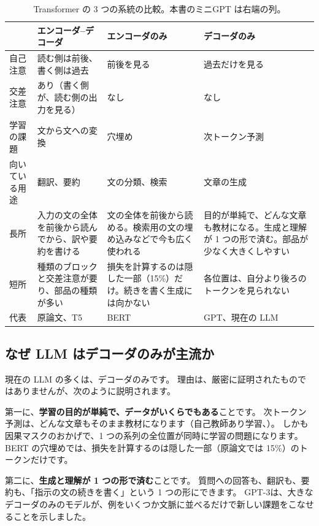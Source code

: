 \begin{table}[tbp]
\centering
\caption{Transformer の 3 つの系統の比較。本書のミニGPT は右端の列。}
\label{tab:tf-family3}
\small
\setlength{\tabcolsep}{3pt}
\begin{tabular}{>{\raggedright\arraybackslash}p{17mm}>{\raggedright\arraybackslash}p{36mm}>{\raggedright\arraybackslash}p{34mm}>{\raggedright\arraybackslash}p{36mm}}
\toprule
 & エンコーダ–デコーダ & エンコーダのみ & デコーダのみ \\
\midrule
自己注意 & 読む側は前後、書く側は過去 & 前後を見る & 過去だけを見る \\
交差注意 & あり（書く側が、読む側の出力を見る） & なし & なし \\
学習の課題 & 文から文への変換 & 穴埋め & 次トークン予測 \\
向いている用途 & 翻訳、要約 & 文の分類、検索 & 文章の生成 \\
長所 & 入力の文の全体を前後から読んでから、訳や要約を書ける & 文の全体を前後から読める。検索用の文の埋め込みなどで今も広く使われる & 目的が単純で、どんな文章も教材になる。生成と理解が 1 つの形で済む。部品が少なく大きくしやすい \\
短所 & 2 種類のブロックと交差注意が要り、部品の種類が多い & 損失を計算するのは隠した一部（15\%）だけ。続きを書く生成には向かない & 各位置は、自分より後ろのトークンを見られない \\
代表 & 原論文、T5 & BERT & GPT、現在の LLM \\
\bottomrule
\end{tabular}
\end{table}

\subsection*{なぜ LLM はデコーダのみが主流か}

現在の LLM の多くは、デコーダのみです。
理由は、厳密に証明されたものではありませんが、次のように説明されます。

第一に、\textbf{学習の目的が単純で、データがいくらでもある}ことです。
次トークン予測は、どんな文章もそのまま教材になります（自己教師あり学習、）。
しかも因果マスクのおかげで、1 つの系列の全位置が同時に学習の問題になります。
BERT の穴埋めでは、損失を計算するのは隠した一部（原論文では 15\%）のトークンだけです。

第二に、\textbf{生成と理解が 1 つの形で済む}ことです。
質問への回答も、翻訳も、要約も、「指示の文の続きを書く」という 1 つの形にできます。
GPT-3\cite{brown2020language}は、大きなデコーダのみのモデルが、例をいくつか文脈に並べるだけで新しい課題をこなせることを示しました。

